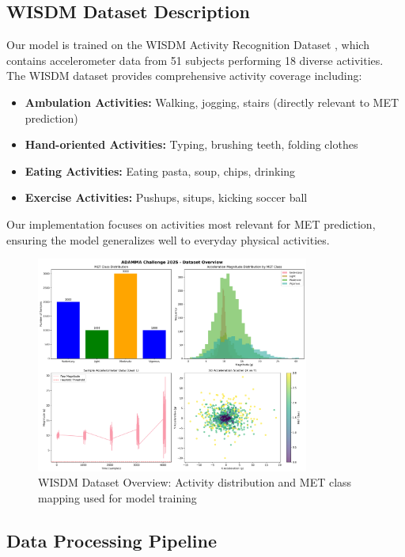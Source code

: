 \documentclass[11pt,a4paper]{article}
\begin{document}
\subsection{WISDM Dataset Description}

Our model is trained on the WISDM Activity Recognition Dataset \cite{kwapisz2011activity}, which contains accelerometer data from 51 subjects performing 18 diverse activities. The WISDM dataset provides comprehensive activity coverage including:

\begin{itemize}
    \item \textbf{Ambulation Activities:} Walking, jogging, stairs (directly relevant to MET prediction)
    \item \textbf{Hand-oriented Activities:} Typing, brushing teeth, folding clothes
    \item \textbf{Eating Activities:} Eating pasta, soup, chips, drinking
    \item \textbf{Exercise Activities:} Pushups, situps, kicking soccer ball
\end{itemize}

Our implementation focuses on activities most relevant for MET prediction, ensuring the model generalizes well to everyday physical activities.

\begin{figure}[H]
    \centering
    \includegraphics[width=0.8\textwidth]{figures/01_dataset_overview.png}
    \caption{WISDM Dataset Overview: Activity distribution and MET class mapping used for model training}
    \label{fig:dataset_overview}
\end{figure}

\subsection{Data Processing Pipeline}
\end{document}
